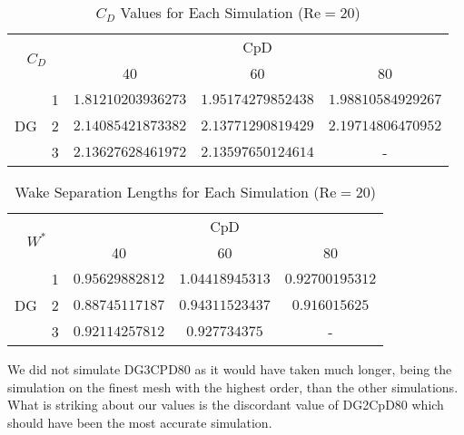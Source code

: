 \begin{table}[htp]
	\centering
	\def\arraystretch{1.5}
			\begin{tabular}{|c|c|c|c|c|}
				\hline
				\multicolumn{2}{|c|}{\multirow{2}{*}{$C_D$}} & \multicolumn{3}{c|}{CpD} \\ \cline{3-5} 
				\multicolumn{2}{|c|}{}                       & 40     & 60    & 80    \\ \hline
				\multirow{3}{*}{DG}            & 1           &    $1.81210203936273$    &  $1.95174279852438$     &    $1.98810584929267$    \\ \cline{2-5} 
				& 2           &    $2.14085421873382$    &    $2.13771290819429$   &   $2.19714806470952$     \\ \cline{2-5} 
				& 3           &    $2.13627628461972$    &     $2.13597650124614$  &   -     \\ \hline
			\end{tabular}
			\caption[$C_D$ Values for each simulation]{$C_D$ Values for Each Simulation ($\text{Re} = 20$)}	
			\label{C_D20}
		\end{table}
			\begin{table}[htp]
		\centering
		\def\arraystretch{1.5}
		\begin{tabular}{|c|c|c|c|c|}
			\hline
			\multicolumn{2}{|c|}{\multirow{2}{*}{$W^*$}} & \multicolumn{3}{c|}{CpD} \\ \cline{3-5} 
			\multicolumn{2}{|c|}{}                       & 40     & 60    & 80    \\ \hline
			\multirow{3}{*}{DG}            & 1           &    $0.95629882812$    &     $1.04418945313$  &    $0.92700195312$    \\ \cline{2-5} 
			& 2           &    $0.88745117187$    &     $0.94311523437$  &    $0.916015625$    \\ \cline{2-5} 
			& 3           &     $0.92114257812$   &     $0.927734375$  &    -    \\ \hline
		\end{tabular}
		\caption{Wake Separation Lengths for Each Simulation ($\text{Re} = 20$)}	
		\label{W20}
\end{table}
We did not simulate DG3CPD80 as it would have taken much longer, being the simulation on the finest mesh with the highest order, than the other simulations. What is striking about our values is the discordant value of DG2CpD80 which should have been the most accurate simulation. 
